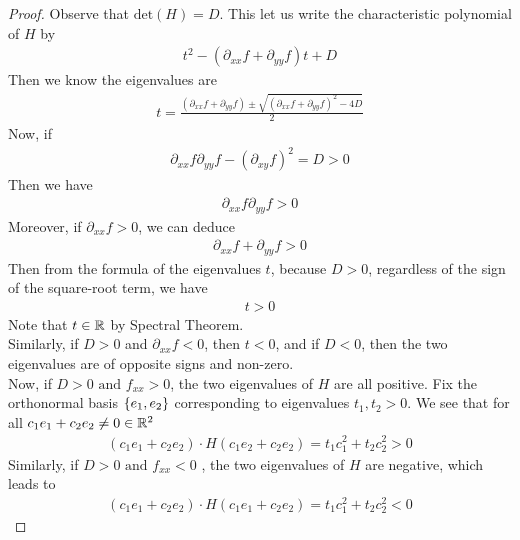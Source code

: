 \documentclass{report}
\begin{document}
\begin{proof}
Observe that $\text{det}(H)=D$. This let us write the characteristic polynomial of $H$ by
\begin{align*}
t^2 - (\partial_{xx}f+ \partial _{yy}f)t + D
\end{align*}
Then we know the eigenvalues are 
\begin{align*}
  t= \frac{(\partial_{xx}f+\partial_{yy}f)\pm \sqrt{(\partial_{xx}f+\partial_{yy}f)^2- 4D} }{2}
\end{align*}
Now, if
\begin{align*}
\partial_{xx}f\partial_{yy}f- (\partial_{xy}f)^2 =D>0
\end{align*}
Then we have 
\begin{align*}
\partial_{xx}f\partial_{yy}f>0
\end{align*}
Moreover, if $\partial_{xx}f>0$, we can deduce 
\begin{align*}
\partial_{xx}f+\partial_{yy}f>0
\end{align*}
Then from the formula of the eigenvalues $t$, because $D>0$, regardless of the sign of the square-root term, we have 
\begin{align*}
t>0
\end{align*}
Note that $t\in\mathbb{R}$ by Spectral Theorem.\\

Similarly, if $D>0$ and $\partial_{xx}f<0$, then $t<0$, and if $D<0$, then the two eigenvalues are of opposite signs and non-zero.\\

Now, if $D>0\text{ and }f_{xx}>0$, the two eigenvalues of $H$ are all positive. Fix the orthonormal basis $\{ e_1,e_2 \}$ corresponding to eigenvalues $t_1,t_2>0$. We see that for all $c_1e_1+c_2e_2\neq 0\in\mathbb{R}^2$
 \begin{align*}
   (c_1e_1+c_2e_2)\cdot H(c_1e_2+c_2e_2)= t_1c_1^2 + t_2c_2^2 >0
\end{align*}
Similarly, if $D>0\text{ and }f_{xx}<0$ , the two eigenvalues of $H$ are negative, which leads to 
\begin{align*}
  (c_1e_1+c_2e_2)\cdot H(c_1e_1+c_2e_2)=t_1c_1^2 +t_2c_2^2<0
\end{align*}






\end{proof}
\end{document}
